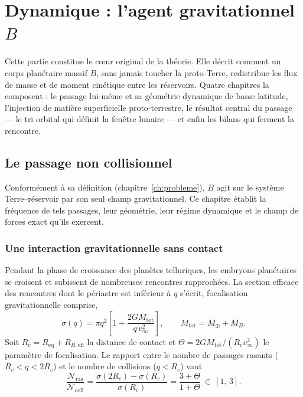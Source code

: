 \documentclass[11pt,a4paper,openany]{report}
\newcommand{\Mt}{M_{\oplus}}
\newcommand{\Req}{R_{\mathrm{eq}}}
\newcommand{\Mtot}{M_{\mathrm{tot}}}
\begin{document}
\part{Dynamique : l'agent gravitationnel \texorpdfstring{$B$}{B}}
\label{part:dynamique}

\noindent
Cette partie constitue le c\oe ur original de la théorie. Elle décrit comment un corps planétaire
massif $B$, sans jamais toucher la proto-Terre, redistribue les flux de masse et de moment
cinétique entre les réservoirs. Quatre chapitres la composent : le passage lui-même et sa
géométrie dynamique de basse latitude, l'injection de matière superficielle proto-terrestre, le
résultat central du passage --- le tri orbital qui définit la fenêtre lunaire --- et enfin les
bilans qui ferment la rencontre.

\chapter{Le passage non collisionnel}
\label{ch:passage}\label{sec:passage}

Conformément à sa définition (chapitre~\ref{ch:probleme}), $B$ agit sur le système
Terre--réservoir par son seul champ gravitationnel. Ce chapitre établit la fréquence de tels
passages, leur géométrie, leur régime dynamique et le champ de forces exact qu'ils exercent.

\section{Une interaction gravitationnelle sans contact}

Pendant la phase de croissance des planètes telluriques, les embryons planétaires se croisent
et subissent de nombreuses rencontres rapprochées. La section efficace des rencontres dont le
périastre est inférieur à $q$ s'écrit, focalisation gravitationnelle comprise,
\begin{equation}
\sigma(q)=\pi q^2\left[1+\frac{2G\Mtot}{q\,v_\infty^2}\right],
\qquad \Mtot=\Mt+M_B.
\label{eq:sigma}
\end{equation}
Soit $R_c=\Req+R_{B,\mathrm{eff}}$ la distance de contact et $\Theta=2G\Mtot/(R_c v_\infty^2)$ le
paramètre de focalisation. Le rapport entre le nombre de passages rasants
($R_c<q<2R_c$) et le nombre de collisions ($q<R_c$) vaut
\begin{equation}
\frac{\mathcal{N}_{\mathrm{ras}}}{\mathcal{N}_{\mathrm{coll}}}
=\frac{\sigma(2R_c)-\sigma(R_c)}{\sigma(R_c)}
=\frac{3+\Theta}{1+\Theta}\ \in\ [1,\,3].
\label{eq:frequence}
\end{equation}
\end{document}

